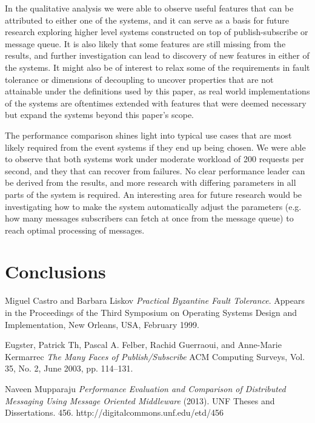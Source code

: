 \documentclass[conference]{IEEEtran}
\begin{document}
In the qualitative analysis we were able to observe useful features that can be attributed to either one of the systems, and it can serve as a basis for future research exploring higher level systems constructed on top of publish-subscribe or message queue. It is also likely that some features are still missing from the results, and further investigation can lead to discovery of new features in either of the systems. It might also be of interest to relax some of the requirements in fault tolerance or dimensions of decoupling to uncover properties that are not attainable under the definitions used by this paper, as real world implementations of the systems are oftentimes extended with features that were deemed necessary but expand the systems beyond this paper's scope.

The performance comparison shines light into typical use cases that are most likely required from the event systems if they end up being chosen. We were able to observe that both systems work under moderate workload of 200 requests per second, and they that can recover from failures. No clear performance leader can be derived from the results, and more research with differing parameters in all parts of the system is required. An interesting area for future research would be investigating how to make the system automatically adjust the parameters (e.g. how many messages subscribers can fetch at once from the message queue) to reach optimal processing of messages.



\section{Conclusions}

{}

\begin{thebibliography}{9}
Miguel Castro and Barbara Liskov
\textit{Practical Byzantine Fault Tolerance}. 
Appears in the Proceedings of the Third Symposium on Operating Systems Design and Implementation, New Orleans, USA, February 1999.

Eugster, Patrick Th, Pascal A. Felber, Rachid Guerraoui, and Anne-Marie Kermarrec
\textit{The Many Faces of Publish/Subscribe}
ACM Computing Surveys, Vol. 35, No. 2, June 2003, pp. 114–131.
 
Naveen Mupparaju
\textit{Performance Evaluation and Comparison of Distributed Messaging Using Message Oriented Middleware}
(2013). UNF Theses and Dissertations. 456.
http://digitalcommons.unf.edu/etd/456
 
\end{thebibliography}
\end{document}
